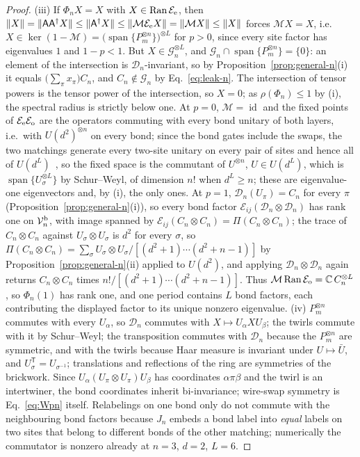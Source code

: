 \documentclass[aps,prx,reprint,superscriptaddress,nobibnotes,longbibliography]{revtex4-2}
\theoremstyle{remark}
\newcommand{\id}{\operatorname{id}}
\newcommand{\Ran}{\operatorname{Ran}}
\begin{document}
\begin{proof}
(iii) If $\Phi_nX=X$ with $X\in\Ran\mathcal E_{\rm e}$, then $\|X\|=\|\mathsf A\mathsf A^\dagger X\|\le\|\mathsf A^\dagger X\|\le\|\mathcal M\mathcal E_{\rm e}X\|=\|\mathcal MX\|\le\|X\|$ forces $\mathcal MX=X$, i.e.\ $X\in\ker(1-\mathcal M)=\bigl(\operatorname{span}\{P_m^{\otimes n}\}\bigr)^{\otimes L}$ for $p>0$, since every site factor has eigenvalues $1$ and $1-p<1$.  But $X\in\mathcal G_n^{\otimes L}$, and $\mathcal G_n\cap\operatorname{span}\{P_m^{\otimes n}\}=\{0\}$: an element of the intersection is $\mathcal D_n$-invariant, so by Proposition~\ref{prop:general-n}(i) it equals $\bigl(\sum_\pi x_\pi\bigr)C_n$, and $C_n\notin\mathcal G_n$ by Eq.~\eqref{eq:leak-n}.  The intersection of tensor powers is the tensor power of the intersection, so $X=0$; as $\rho(\Phi_n)\le1$ by (i), the spectral radius is strictly below one.  At $p=0$, $\mathcal M=\id$ and the fixed points of $\mathcal E_{\rm e}\mathcal E_{\rm o}$ are the operators commuting with every bond unitary of both layers, i.e.\ with $U(d^2)^{\otimes n}$ on every bond; since the bond gates include the swaps, the two matchings generate every two-site unitary on every pair of sites and hence all of $U(d^L)$~\cite{Brylinski2002}, so the fixed space is the commutant of $U^{\otimes n}$, $U\in U(d^L)$, which is $\operatorname{span}\{U_\sigma^{\otimes L}\}$ by Schur--Weyl, of dimension $n!$ when $d^L\ge n$; these are eigenvalue-one eigenvectors and, by (i), the only ones.  At $p=1$, $\mathcal D_n(U_\pi)=C_n$ for every $\pi$ (Proposition~\ref{prop:general-n}(i)), so every bond factor $\mathcal E_{ij}(\mathcal D_n\otimes\mathcal D_n)$ has rank one on $\mathcal V_n^{\rm b}$, with image spanned by $\mathcal E_{ij}(C_n\otimes C_n)=\Pi(C_n\otimes C_n)$; the trace of $C_n\otimes C_n$ against $U_\sigma\otimes U_\sigma$ is $d^2$ for every $\sigma$, so $\Pi(C_n\otimes C_n)=\sum_\sigma U_\sigma\otimes U_\sigma/[(d^2+1)\cdots(d^2+n-1)]$ by Proposition~\ref{prop:general-n}(ii) applied to $U(d^2)$, and applying $\mathcal D_n\otimes\mathcal D_n$ again returns $C_n\otimes C_n$ times $n!/[(d^2+1)\cdots(d^2+n-1)]$.  Thus $\mathcal M\Ran\mathcal E_{\rm o}=\mathbb C\,C_n^{\otimes L}$, so $\Phi_n(1)$ has rank one, and one period contains $L$ bond factors, each contributing the displayed factor to its unique nonzero eigenvalue.
(iv) $P_m^{\otimes n}$ commutes with every $U_\alpha$, so $\mathcal D_n$ commutes with $X\mapsto U_\alpha XU_\beta$; the twirls commute with it by Schur--Weyl; the transposition commutes with $\mathcal D_n$ because the $P_m^{\otimes n}$ are symmetric, and with the twirls because Haar measure is invariant under $U\mapsto\bar U$, and $U_\sigma^{\mathsf T}=U_{\sigma^{-1}}$; translations and reflections of the ring are symmetries of the brickwork.  Since $U_\alpha(U_\pi\otimes U_\pi)U_\beta$ has coordinates $\alpha\pi\beta$ and the twirl is an intertwiner, the bond coordinates inherit bi-invariance; wire-swap symmetry is Eq.~\eqref{eq:Wpn} itself.  Relabelings on one bond only do not commute with the neighbouring bond factors because $J_n$ embeds a bond label into \emph{equal} labels on two sites that belong to different bonds of the other matching; numerically the commutator is nonzero already at $n=3$, $d=2$, $L=6$.
\end{proof}
\end{document}
